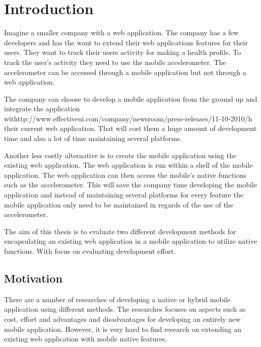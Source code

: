 \chapter{Introduction}
Imagine a smaller company with a web application. The company has a few developers and has the want to extend their web applications features for their users. They want to track their users activity for making a health profile. To track the user's activity they need to use the mobile accelerometer. The accelerometer can be accessed through a mobile application but not through a web application. 




The company can choose to develop a mobile application from the ground up and integrate the application withttp://www.effectiveui.com/company/newsroom/press-releases/11-10-2010/h their current web application. That will cost them a huge amount of development time and also a lot of time maintaining several platforms.

Another less costly alternative is to create the mobile application using the existing web application. The web application is run within a shell of the mobile application. The web application can then access the mobile’s native functions such as the accelerometer. This will save the company time developing the mobile application and instead of maintaining several platforms for every feature the mobile application only need to be maintained in regards of the use of the accelerometer. 

The aim of this thesis is to evaluate two different development methods for encapsulating an existing web application in a mobile application to utilize native functions. With focus on evaluating development effort.

\section{Motivation}
There are a number of researches of developing a native or hybrid mobile application using different methods. The researches focuses on aspects such as cost, effort and advantages and disadvantages for developing an entirely new mobile application. However, it is very hard to find research on extending an existing web application with mobile native features. 

